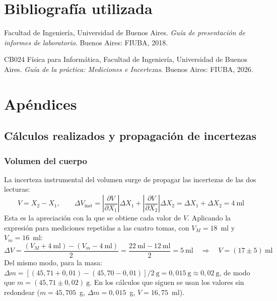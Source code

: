 \documentclass[12pt,a4paper]{article}
\begin{document}
\section{Bibliografía utilizada}
\begin{enumerate}[label={[\arabic*]},leftmargin=2.5em]
  \item Facultad de Ingeniería, Universidad de Buenos Aires. \emph{Guía de presentación de
        informes de laboratorio}. Buenos Aires: FIUBA, 2018.
  \item CB024 Física para Informática, Facultad de Ingeniería, Universidad de Buenos Aires.
        \emph{Guía de la práctica: Mediciones e Incertezas}. Buenos Aires: FIUBA, 2026.
\end{enumerate}

\section{Apéndices}
\label{sec:apendices}
\renewcommand{\thesubsection}{\alph{subsection})}
\renewcommand{\thesubsubsection}{\alph{subsection}.\arabic{subsubsection}}
\titleformat{\subsection}{\normalsize\bfseries}{\thesubsection}{0.6em}{}

\subsection{Cálculos realizados y propagación de incertezas}
\label{ap:calculos}

\subsubsection{Volumen del cuerpo}
La incerteza instrumental del volumen surge de propagar las incertezas de las dos lecturas:
\[
  V = X_2 - X_1, \qquad
  \Delta V_{\text{inst}} = \left|\frac{\partial V}{\partial X_1}\right| \Delta X_1
                         + \left|\frac{\partial V}{\partial X_2}\right| \Delta X_2
                         = \Delta X_1 + \Delta X_2 = 4\ \mathrm{ml}
\]
Esta es la apreciación con la que se obtiene cada valor de $V$. Aplicando la expresión para
mediciones repetidas a las cuatro tomas, con $V_M = 18$~ml y $V_m = 16$~ml:
\[
  \Delta V = \frac{(V_M + 4\ \mathrm{ml}) - (V_m - 4\ \mathrm{ml})}{2}
           = \frac{22\ \mathrm{ml} - 12\ \mathrm{ml}}{2} = 5\ \mathrm{ml}
  \quad\Rightarrow\quad
  V = (17 \pm 5)\ \mathrm{ml}
\]
Del mismo modo, para la masa:
$\Delta m = [(45{,}71 + 0{,}01) - (45{,}70 - 0{,}01)]/2\ \mathrm{g} = 0{,}015\ \mathrm{g}
\approx 0{,}02\ \mathrm{g}$, de modo que $m = (45{,}71 \pm 0{,}02)\ \mathrm{g}$. En los cálculos
que siguen se usan los valores sin redondear ($m = 45{,}705$~g, $\Delta m = 0{,}015$~g,
$V = 16{,}75$~ml).
\end{document}
